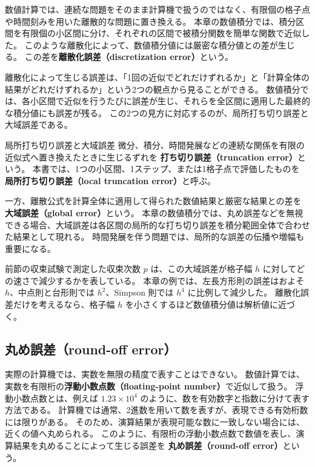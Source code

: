 数値計算では、連続な問題をそのまま計算機で扱うのではなく、有限個の格子点や時間刻みを用いた離散的な問題に置き換える。
本章の数値積分では、積分区間を有限個の小区間に分け、それぞれの区間で被積分関数を簡単な関数で近似した。
このような離散化によって、数値積分値には厳密な積分値との差が生じる。
この差を\textbf{離散化誤差（discretization error）}という。

離散化によって生じる誤差は、「1回の近似でどれだけずれるか」と「計算全体の結果がどれだけずれるか」という2つの観点から見ることができる。
数値積分では、各小区間で近似を行うたびに誤差が生じ、それらを全区間に適用した最終的な積分値にも誤差が残る。
この2つの見方に対応するのが、局所打ち切り誤差と大域誤差である。

\begin{definitionbox}{局所打ち切り誤差と大域誤差}
微分、積分、時間発展などの連続な関係を有限の近似式へ置き換えたときに生じるずれを
\textbf{打ち切り誤差（truncation error）}という。
本書では、1つの小区間、1ステップ、または1格子点で評価したものを
\textbf{局所打ち切り誤差（local truncation error）}と呼ぶ。

一方、離散公式を計算全体に適用して得られた数値結果と厳密な結果との差を
\textbf{大域誤差（global error）}という。
本章の数値積分では、丸め誤差などを無視できる場合、大域誤差は各区間の局所的な打ち切り誤差を積分範囲全体で合わせた結果として現れる。
時間発展を伴う問題では、局所的な誤差の伝播や増幅も重要になる。
\end{definitionbox}

前節の収束試験で測定した収束次数 $p$ は、この大域誤差が格子幅 $h$ に対してどの速さで減少するかを表している。
本章の例では、左長方形則の誤差はおよそ $h$、中点則と台形則では $h^2$、Simpson 則では $h^4$ に比例して減少した。
離散化誤差だけを考えるなら、格子幅 $h$ を小さくするほど数値積分値は解析値に近づく。

\subsection{丸め誤差（round-off error）}

実際の計算機では、実数を無限の精度で表すことはできない。
数値計算では、実数を有限桁の\textbf{浮動小数点数（floating-point number）}で近似して扱う。
浮動小数点数とは、例えば $1.23\times 10^4$ のように、数を有効数字と指数に分けて表す方法である。
計算機では通常、2進数を用いて数を表すが、表現できる有効桁数には限りがある。
そのため、演算結果が表現可能な数に一致しない場合には、近くの値へ丸められる。
このように、有限桁の浮動小数点数で数値を表し、演算結果を丸めることによって生じる誤差を
\textbf{丸め誤差（round-off error）}という。

